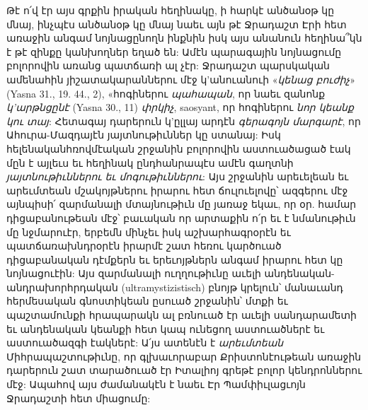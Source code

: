 \documentclass{article}
\begin{document}
{Թէ ո՛վ էր այս գրքին իրական հեղինակը, ի հարկէ անծանօթ կը մնայ, ինչպէս անծանօթ կը մնայ նաեւ այն թէ Ջրադաշտ Էրի հետ առաջին անգամ նոյնացընողն ինքնին իսկ այս անանուն հեղինա՞կն է թէ զինքը կանխողներ եղած են: Ամէն պարագային նոյնացումը բոլորովին առանց պատճառի ալ չէր: Ջրադաշտ պարսկական ամենահին յիշատակարաններու մէջ կ'անուանուի «\emph{կենաց բուժիչ}» (Yasna 31., 19. 44., 2), «հոգիներու \emph{պահապան}, որ նաեւ զանոնք \emph{կ'արթնցընէ} (Yasna 30., 11) \emph{փրկիչ}, saosyant, որ հոգիներու \emph{նոր կեանք կու տայ}: Հետագայ դարերուն կ'ըլլայ արդէն \emph{գերագոյն մարգարէ}, որ Ահուրա-Մազդայէն յայտնութիւններ կը ստանայ: Իսկ հելենականհռովմէական շրջանին բոլորովին աստուածացած էակ մըն է այլեւս եւ հեղինակ ընդհանրապէս ամէն գաղտնի \emph{յայտնութիւններու եւ մոգութիւններու}: Այս շրջանին արեւելեան եւ արեւմտեան մշակոյթներու իրարու հետ ճուլուելովը՝ ազգերու մէջ այնպիսի՛ զարմանալի մտայնութիւն մը յառաջ եկաւ, որ օր. համար դիցաբանութեան մէջ՝ բաւական որ արտաքին ո՛ր եւ է նմանութիւն մը նջմարուէր, երբեմն մինչեւ իսկ աշխարհագրօրէն եւ պատճառախնդրօրէն իրարմէ շատ հեռու կարծուած դիցաբանական դէմքերն եւ երեւոյթներն անգամ իրարու հետ կը նոյնացուէին: Այս զարմանալի ուղղութիւնը աւելի անդենական-անդրախորհրդական (ultramystizistisch) բնոյթ կրելուն՝ մանաւանդ հերմեսական գնոստիկեան ըսուած շրջանին՝ մտքի եւ պաշտամունքի հրապարակն ալ բռնուած էր աւելի սանդարամետի եւ անդենական կեանքի հետ կապ ունեցող աստուածներէ եւ աստուածազգի էակներէ: Ա՛յս ատենէն է \emph{արեւմտեան} Միհրապաշտութիւնը, որ գլխաւորաբար Քրիստոնէութեան առաջին դարերուն շատ տարածուած էր Իտալիոյ գրեթէ բոլոր կենդրոններու մէջ: Ապահով այս ժամանակէն է նաեւ Էր Պամփիւլացւոյն Ջրադաշտի հետ միացումը:

}
\end{document}
